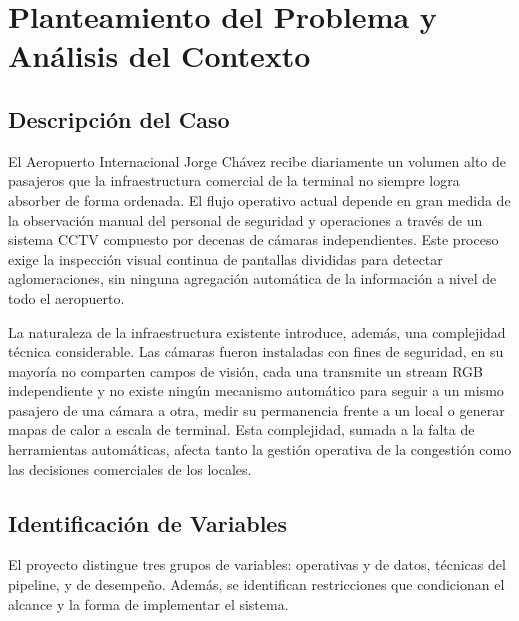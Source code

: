 \documentclass[12pt,letterpaper]{article}
\begin{document}

\section{Planteamiento del Problema y Análisis del Contexto}

\subsection{Descripción del Caso}

El Aeropuerto Internacional Jorge Chávez recibe diariamente un volumen
alto de pasajeros que la infraestructura comercial de la terminal no
siempre logra absorber de forma ordenada. El flujo operativo actual
depende en gran medida de la observación manual del personal de
seguridad y operaciones a través de un sistema CCTV compuesto por decenas
de cámaras independientes. Este proceso exige la inspección visual
continua de pantallas divididas para detectar aglomeraciones, sin ninguna
agregación automática de la información a nivel de todo el aeropuerto.

La naturaleza de la infraestructura existente introduce, además, una
complejidad técnica considerable. Las cámaras fueron instaladas con fines
de seguridad, en su mayoría no comparten campos de visión, cada una
transmite un stream RGB independiente y no existe ningún mecanismo
automático para seguir a un mismo pasajero de una cámara a otra, medir su
permanencia frente a un local o generar mapas de calor a escala de
terminal. Esta complejidad, sumada a la falta de herramientas
automáticas, afecta tanto la gestión operativa de la congestión como las
decisiones comerciales de los locales.

\subsection{Identificación de Variables}

El proyecto distingue tres grupos de variables: operativas y de datos,
técnicas del pipeline, y de desempeño. Además, se identifican
restricciones que condicionan el alcance y la forma de implementar el
sistema.
\end{document}
